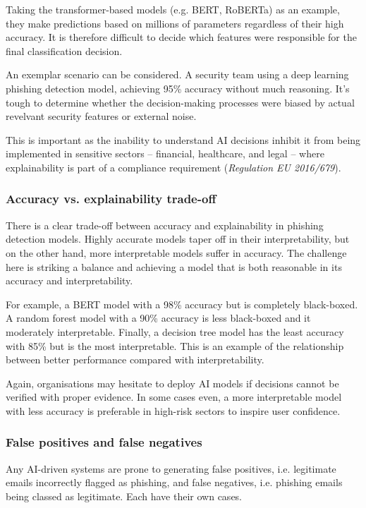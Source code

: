 \noindent Taking the transformer-based models (e.g. BERT, RoBERTa) as an example, they make predictions based on millions of parameters regardless of their high accuracy. It is therefore difficult to decide which features were responsible for the final classification decision.\newline

\noindent An exemplar scenario can be considered. A security team using a deep learning phishing detection model, achieving 95\% accuracy without much reasoning. It's tough to determine whether the decision-making processes were biased by actual revelvant security features or external noise.\newline

\noindent This is important as the inability to understand AI decisions inhibit it from being implemented in sensitive sectors -- financial, healthcare, and legal -- where explainability is part of a compliance requirement (\textit{Regulation EU 2016/679}).

\subsubsection*{Accuracy vs. explainability trade-off}
There is a clear trade-off between accuracy and explainability in phishing detection models. Highly accurate models taper off in their interpretability, but on the other hand, more interpretable models suffer in accuracy. The challenge here is striking a balance and achieving a model that is both reasonable in its accuracy and interpretability.\newline

\noindent For example, a BERT model with a 98\% accuracy but is completely black-boxed. A random forest model with a 90\% accuracy is less black-boxed and it moderately interpretable. Finally, a decision tree model has the least accuracy with 85\% but is the most interpretable. This is an example of the relationship between better performance compared with interpretability.\newline

\noindent Again, organisations may hesitate to deploy AI models if decisions cannot be verified with proper evidence. In some cases even, a more interpretable model with less accuracy is preferable in high-risk sectors to inspire user confidence.

\subsubsection*{False positives and false negatives}
Any AI-driven systems are prone to generating false positives, i.e. legitimate emails incorrectly flagged as phishing, and false negatives, i.e. phishing emails being classed as legitimate. Each have their own cases.

